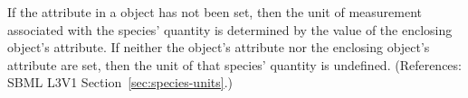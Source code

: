 If the attribute  in a \Species object has not been
set, then the unit of measurement associated with the species' quantity is
determined by the value of the enclosing \Model object's
 attribute.  If neither the \Species object's
 attribute nor the enclosing \Model object's
 attribute are set, then the unit of that species'
quantity is undefined.  (References: SBML L3V1
Section~\ref{sec:species-units}.)
